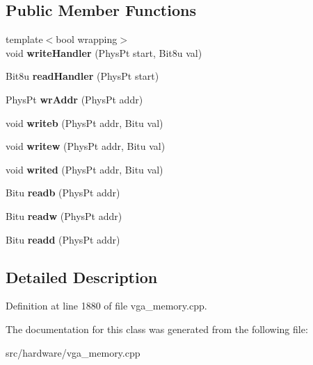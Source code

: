 \subsection*{Public Member Functions}
\begin{DoxyCompactItemize}
\item 
\hypertarget{classVGA__AMS__Handler_aeb0a1c400b9162e4e5e48bf0905d4865}{{\footnotesize template$<$bool wrapping$>$ }\\void {\bfseries write\-Handler} (Phys\-Pt start, Bit8u val)}\label{classVGA__AMS__Handler_aeb0a1c400b9162e4e5e48bf0905d4865}

\item 
\hypertarget{classVGA__AMS__Handler_a5661278164e2d7259ee9c8fe4c35d6df}{Bit8u {\bfseries read\-Handler} (Phys\-Pt start)}\label{classVGA__AMS__Handler_a5661278164e2d7259ee9c8fe4c35d6df}

\item 
\hypertarget{classVGA__AMS__Handler_a63b72ffd104220eb928c683bae72def3}{Phys\-Pt {\bfseries wr\-Addr} (Phys\-Pt addr)}\label{classVGA__AMS__Handler_a63b72ffd104220eb928c683bae72def3}

\item 
\hypertarget{classVGA__AMS__Handler_a59765d00055305e3d5d9cae3eda1a135}{void {\bfseries writeb} (Phys\-Pt addr, Bitu val)}\label{classVGA__AMS__Handler_a59765d00055305e3d5d9cae3eda1a135}

\item 
\hypertarget{classVGA__AMS__Handler_a2ca35cd2132c57ab9a6cd145ca686efd}{void {\bfseries writew} (Phys\-Pt addr, Bitu val)}\label{classVGA__AMS__Handler_a2ca35cd2132c57ab9a6cd145ca686efd}

\item 
\hypertarget{classVGA__AMS__Handler_a3a628a09de5d72345c7b602f162de07b}{void {\bfseries writed} (Phys\-Pt addr, Bitu val)}\label{classVGA__AMS__Handler_a3a628a09de5d72345c7b602f162de07b}

\item 
\hypertarget{classVGA__AMS__Handler_aa0a91b3133a6f53ab71af097705e5576}{Bitu {\bfseries readb} (Phys\-Pt addr)}\label{classVGA__AMS__Handler_aa0a91b3133a6f53ab71af097705e5576}

\item 
\hypertarget{classVGA__AMS__Handler_a91ae2471698b76066cff1f58dac6708c}{Bitu {\bfseries readw} (Phys\-Pt addr)}\label{classVGA__AMS__Handler_a91ae2471698b76066cff1f58dac6708c}

\item 
\hypertarget{classVGA__AMS__Handler_a98c3e7090b6a26e69c4afc84dc092415}{Bitu {\bfseries readd} (Phys\-Pt addr)}\label{classVGA__AMS__Handler_a98c3e7090b6a26e69c4afc84dc092415}

\end{DoxyCompactItemize}


\subsection{Detailed Description}


Definition at line 1880 of file vga\-\_\-memory.\-cpp.



The documentation for this class was generated from the following file\-:\begin{DoxyCompactItemize}
\item 
src/hardware/vga\-\_\-memory.\-cpp\end{DoxyCompactItemize}
